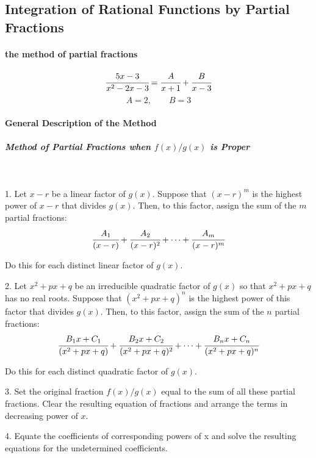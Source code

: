 \documentclass{article}
\begin{document}
        \subsection{Integration of Rational Functions by Partial Fractions}
            \paragraph{the method of partial fractions}
            \[\cfrac{5x-3}{x^2-2x-3}=\cfrac{A}{x+1}+\cfrac{B}{x-3}\]
            \[A=2,\qquad B=3\]
            \paragraph{General Description of the Method}
                \subparagraph{Method of Partial Fractions when $f(x)/g(x)$ is Proper}
                \text{}\\
                \par 1. Let $x-r$ be a linear factor of $g(x)$. Suppose that $(x-r)^m$ is the highest power of $x-r$ that divides $g(x)$. Then, to this factor, assign the sum of the $m$ partial fractions:
                \[\cfrac{A_1}{(x-r)}+\cfrac{A_2}{(x-r)^2}+\cdots+\cfrac{A_m}{(x-r)^m}\]
                \par Do this for each distinct linear factor of $g(x)$.
                \par 2. Let $x^2+px+q$ be an irreducible quadratic factor of $g(x)$ so that $x^2+px+q$ has no real roots. Suppose that $(x^2+px+q)^n$ is the highest power of this factor that divides $g(x)$. Then, to this factor, assign the sum of the $n$ partial fractions:
                \[\cfrac{B_1x+C_1}{(x^2+px+q)}+\cfrac{B_2x+C_2}{(x^2+px+q)^2}+\cdots+\cfrac{B_nx+C_n}{(x^2+px+q)^n}\]
                \par Do this for each distinct quadratic factor of $g(x)$.
                \par 3. Set the original fraction $f(x)/g(x)$ equal to the sum of all these partial fractions. Clear the resulting equation of fractions and arrange the terms in decreasing power of $x$.
                \par 4. Equate the coefficients of corresponding powers of x and solve the resulting equations for the undetermined coefficients.
\end{document}

